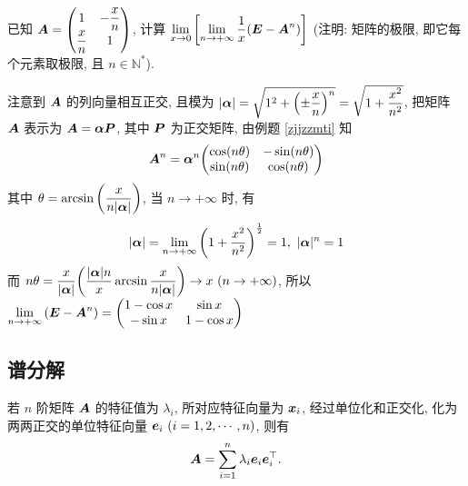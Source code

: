 \begin{example}
    已知 $\vb*{A}=\mqty(1&-\dfrac{x}{n}\\ \dfrac{x}{n}&1)$, 计算 $\displaystyle \lim_{x \to 0}\qty[\lim_{n \to +\infty}\dfrac{1}{x}\qty(\vb*{E}-\vb*{A}^{n})]$ (注明: 矩阵的极限, 即它每个元素取极限, 且 $n\in\mathbb{N}^{*}$).
\end{example}
\begin{solution}
    注意到 $\vb*{A}$ 的列向量相互正交, 且模为 $|\vb*{\alpha}|=\sqrt{1^2+\qty(\pm\dfrac{x}{n})^n}=\sqrt{1+\dfrac{x^2}{n^2}}$, 把矩阵 $\vb*{A}$ 表示为 $\vb*{A}=\vb*{\alpha P}$, 其中 $\vb*{P}$ 为正交矩阵, 由例题 \ref{zjjzzmti} 知
    $$
        \vb*{A}^{n}=\vb*{\alpha}^{n}\mqty(\cos(n\theta)&-\sin(n\theta)\\ \sin(n\theta)&\cos(n\theta))
    $$
    其中 $\theta=\arcsin\qty(\dfrac{x}{n|\vb*{\alpha}|})$, 当 $n\to+\infty$ 时, 有 $$|\vb*{\alpha}|=\lim_{n \to +\infty}\qty(1+\dfrac{x^2}{n^2})^{\frac{1}{2}}=1,~|\vb*{\alpha}|^{n}=1$$
    而 $n\theta=\dfrac{x}{|\vb*{\alpha}|}\qty(\dfrac{|\vb*{\alpha}|n}{x}\arcsin\dfrac{x}{n|\vb*{\alpha}|})\to x~(n\to+\infty)$, 所以 $\displaystyle \lim_{n \to +\infty}\qty(\vb*{E}-\vb*{A}^{n})=\mqty(1-\cos x& \sin x\\ -\sin x&1-\cos x)$

\end{solution}

\subsection{谱分解}

\begin{theorem}[谱分解定理]
    \label{pufjdli}若 $n$ 阶矩阵 $\vb*{A}$ 的特征值为 $\lambda_i$, 所对应特征向量为 $\vb*{x}_i$, 经过单位化和正交化, 化为两两正交的单位特征向量 $\vb*{e}_i~ (i=1,2,\cdots,n)$, 则有
    $$\vb*{A}=\sum_{i=1}^{n}\lambda_i\vb*{e}_i\vb*{e}_i^\top.$$
\end{theorem}

